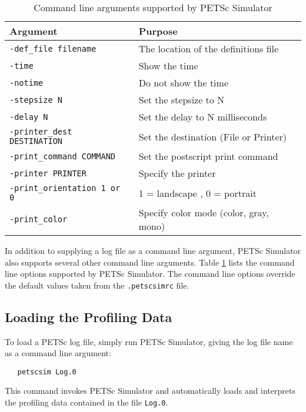 \begin{table}
\begin{tabular}{||l||l||} \hline
{\bf Argument}                  & {\bf Purpose} \\ \hline
{\tt -def\_file filename}       & The location of the definitions file \\ \hline
{\tt -time}                    & Show the time \\ \hline
{\tt -notime}                  & Do not show the time \\ \hline
{\tt -stepsize N}              & Set the stepsize to N \\ \hline
{\tt -delay N}                 & Set the delay to N milliseconds \\ \hline 
{\tt -printer\_dest DESTINATION}& Set the destination (File or Printer) \\ \hline
{\tt -print\_command COMMAND}   & Set the postscript print command \\ \hline
{\tt -printer PRINTER}         & Specify the printer \\ \hline
{\tt -print\_orientation 1 or 0}& 1 = landscape , 0 = portrait \\ \hline
{\tt -print\_color}             & Specify color mode (color, gray, mono) \\ \hline
\end{tabular}
\label{PETSc Simulator command line options}
\caption{Command line arguments supported by PETSc Simulator}
\end{table}

In addition to supplying a log file as a command line argument, PETSc
Simulator also supports several other command line arguments.  Table
\ref{PETSc Simulator command line options} lists the command line
options supported by PETSc Simulator.  The command line options
override the default values taken from the {\tt .petscsimrc} file.

\subsection{Loading the Profiling Data}

To load a PETSc log file, simply run PETSc Simulator, giving the log 
file name as a command line argument:
\begin{verbatim}
   petscsim Log.0
\end{verbatim}
This command invokes PETSc Simulator and automatically loads and
interprets the profiling data contained in the file {\tt Log.0}.

